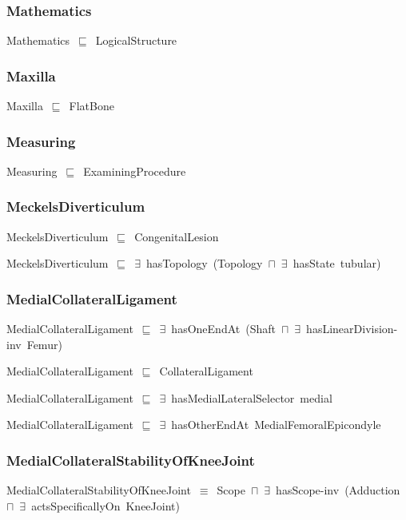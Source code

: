 \documentclass{article}
\begin{document}
\subsubsection*{Mathematics}

Mathematics~\ensuremath{\sqsubseteq}~LogicalStructure~

\subsubsection*{Maxilla}

Maxilla~\ensuremath{\sqsubseteq}~FlatBone~

\subsubsection*{Measuring}

Measuring~\ensuremath{\sqsubseteq}~ExaminingProcedure~

\subsubsection*{MeckelsDiverticulum}

MeckelsDiverticulum~\ensuremath{\sqsubseteq}~CongenitalLesion~

MeckelsDiverticulum~\ensuremath{\sqsubseteq}~\ensuremath{\exists}~hasTopology~(Topology~\ensuremath{\sqcap}~\ensuremath{\exists}~hasState~tubular)~

\subsubsection*{MedialCollateralLigament}

MedialCollateralLigament~\ensuremath{\sqsubseteq}~\ensuremath{\exists}~hasOneEndAt~(Shaft~\ensuremath{\sqcap}~\ensuremath{\exists}~hasLinearDivision-inv~Femur)~

MedialCollateralLigament~\ensuremath{\sqsubseteq}~CollateralLigament~

MedialCollateralLigament~\ensuremath{\sqsubseteq}~\ensuremath{\exists}~hasMedialLateralSelector~medial~

MedialCollateralLigament~\ensuremath{\sqsubseteq}~\ensuremath{\exists}~hasOtherEndAt~MedialFemoralEpicondyle~

\subsubsection*{MedialCollateralStabilityOfKneeJoint}

MedialCollateralStabilityOfKneeJoint~\ensuremath{\equiv}~Scope~\ensuremath{\sqcap}~\ensuremath{\exists}~hasScope-inv~(Adduction~\ensuremath{\sqcap}~\ensuremath{\exists}~actsSpecificallyOn~KneeJoint)
\end{document}

